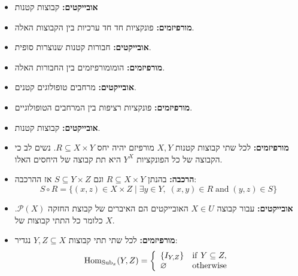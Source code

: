 \documentclass{tstextbook}
\begin{document}
\begin{definition}
  \begin{itemize}
    \item \textbf{אובייקטים:} קבוצות קטנות
    \item \textbf{מורפיזמים:} פונקציות חד חד ערכיות בין הקבוצות האלה.
  \end{itemize}
\end{definition}
\begin{definition}
  \begin{itemize}
    \item \textbf{אובייקטים:} חבורות קטנות שנוצרות סופית.
    \item \textbf{מורפיזמים:} הומומורפיזמים בין החבורות האלה.
  \end{itemize}
\end{definition}
\begin{definition}
  \begin{itemize}
    \item \textbf{אובייקטים:} מרחבים טופולוגים קטנים.
    \item \textbf{מורפיזמים:} פונקציות רציפות בין המרחבים הטופולוגיים.
  \end{itemize}
\end{definition}
\begin{definition}
  \begin{itemize}
    \item \textbf{אובייקטים:} קבוצות קטנות.
    \item \textbf{מורפיזמים:} לכל שתי קבוצות קטנות \(X,Y\) מורפיזם יהיה יחס \(R\subseteq X\times Y\). נשים לב כי הקבוצה של כל הפונקציות \(Y^{X}\) היא תת קבוצה של היחסים האלו.
    \item \textbf{הרכבה:} בהנתן \(R\subseteq X \times Y\) וגם \(S\subseteq Y \times Z\) אז ההרכבה:
$$S\circ R=\{(x,z)\in X\times Z\mid\exists y\in Y,\;(x,y)\in R\;{\mathrm{and}}\;(y,z)\in S\}$$
  \end{itemize}
\end{definition}
\begin{definition}
  \begin{itemize}
    \item \textbf{אובייקטים:} עבור קבוצה \(X \in U\) האובייקטים הם האיברים של קבוצת החזקה \(\mathcal{P}(X)\). כלומר כל התתי קבוצות של \(X\).
    \item \textbf{מורפיזמים:} לכל שתי תתי קבוצות \(Y,Z \subseteq X\) נגדיר:
$$\operatorname{Hom}_{\operatorname{Sub}_{x}}(Y,Z)={\left\{\begin{array}{l l}{\{I_{Y,Z}\}}&{{\mathrm{if~}}Y\subseteq Z,}\\ {\varnothing }&{{\mathrm{otherwise}}}\end{array}\right.}$$
  \end{itemize}
\end{definition}
\end{document}

